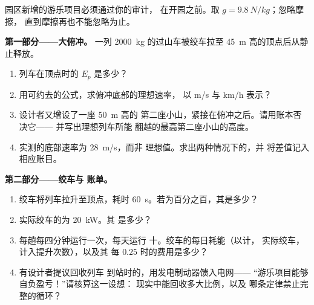 \begin{problem}\label{pb:g9:energy-conversions:1}
园区新增的游乐项目必须通过你的审计，
在开园之前。取 $g = \qty{9.8}{N/kg}$；忽略摩擦，
直到摩擦再也不能忽略为止。

\medskip\noindent\textbf{第一部分——大俯冲。}
一列 \qty{2000}{kg} 的过山车被绞车拉至
\qty{45}{m} 高的顶点后从静止释放。
\begin{enumerate}
  \item 列车在顶点时的 $E_p$ 是多少？
  \item 用可约去的公式，求俯冲底部的理想速率，
        以 \unit{m/s} 与
        \unit{km/h} 表示？
  \item 设计者又增设了一座 \qty{50}{m} 高的
        第二座小山，紧接在俯冲之后。请用账本否决它——
        并写出理想列车所能
        翻越的最高第二座小山的高度。
  \item 实测的底部速率为 \qty{28}{m/s}，而非
        理想值。求出两种情况下的，并
        将差值记入相应账目。
\end{enumerate}

\medskip\noindent\textbf{第二部分——绞车与
账单。}
\begin{enumerate}[resume]
  \item 绞车将列车拉升至顶点，耗时
        \qty{60}{s}。若为百分之百，其是多少？
  \item 实际绞车的为 \qty{20}{kW}。其
        是多少？
  \item 每趟每四分钟运行一次，每天运行
        十。绞车的每日耗能（以计，
        实际绞车，计入提升次数），以及其
        每 $0.25$ 时的费用是多少？
  \item 有设计者提议回收列车
        到站时的，用发电制动器馈入电网——
        “游乐项目能够自负盈亏！”请核算这一设想：
        现实中能回收多大比例，以及
        哪条定律禁止完整的循环？
\end{enumerate}


\end{problem}
